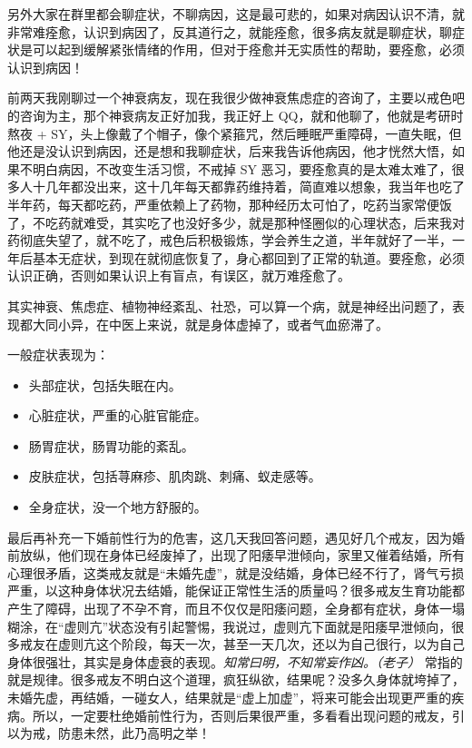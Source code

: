 另外大家在群里都会聊症状，不聊病因，这是最可悲的，如果对病因认识不清，就非常难痊愈，认识到病因了，反其道行之，就能痊愈，很多病友就是聊症状，聊症状是可以起到缓解紧张情绪的作用，但对于痊愈并无实质性的帮助，要痊愈，必须认识到病因！

前两天我刚聊过一个神衰病友，现在我很少做神衰焦虑症的咨询了，主要以戒色吧的咨询为主，那个神衰病友正好加我，我正好上 QQ，就和他聊了，他就是考研时熬夜 + SY，头上像戴了个帽子，像个紧箍咒，然后睡眠严重障碍，一直失眠，但他还是没认识到病因，还是想和我聊症状，后来我告诉他病因，他才恍然大悟，如果不明白病因，不改变生活习惯，不戒掉 SY 恶习，要痊愈真的是太难太难了，很多人十几年都没出来，这十几年每天都靠药维持着，简直难以想象，我当年也吃了半年药，每天都吃药，严重依赖上了药物，那种经历太可怕了，吃药当家常便饭了，不吃药就难受，其实吃了也没好多少，就是那种怪圈似的心理状态，后来我对药彻底失望了，就不吃了，戒色后积极锻炼，学会养生之道，半年就好了一半，一年后基本无症状，到现在就彻底恢复了，身心都回到了正常的轨道。要痊愈，必须认识正确，否则如果认识上有盲点，有误区，就万难痊愈了。

其实神衰、焦虑症、植物神经紊乱、社恐，可以算一个病，就是神经出问题了，表现都大同小异，在中医上来说，就是身体虚掉了，或者气血瘀滞了。

一般症状表现为：

\begin{itemize}
    \item 头部症状，包括失眠在内。
    \item 心脏症状，严重的心脏官能症。
    \item 肠胃症状，肠胃功能的紊乱。
    \item 皮肤症状，包括荨麻疹、肌肉跳、刺痛、蚁走感等。
    \item 全身症状，没一个地方舒服的。
\end{itemize}

最后再补充一下婚前性行为的危害，这几天我回答问题，遇见好几个戒友，因为婚前放纵，他们现在身体已经废掉了，出现了阳痿早泄倾向，家里又催着结婚，所有心理很矛盾，这类戒友就是“未婚先虚”，就是没结婚，身体已经不行了，肾气亏损严重，以这种身体状况去结婚，能保证正常性生活的质量吗？很多戒友生育功能都产生了障碍，出现了不孕不育，而且不仅仅是阳痿问题，全身都有症状，身体一塌糊涂，在“虚则亢”状态没有引起警惕，我说过，虚则亢下面就是阳痿早泄倾向，很多戒友在虚则亢这个阶段，每天一次，甚至一天几次，还以为自己很行，以为自己身体很强壮，其实是身体虚衰的表现。\textit{知常曰明，不知常妄作凶。（老子）} 常指的就是规律。很多戒友不明白这个道理，疯狂纵欲，结果呢？没多久身体就垮掉了，未婚先虚，再结婚，一碰女人，结果就是“虚上加虚”，将来可能会出现更严重的疾病。所以，一定要杜绝婚前性行为，否则后果很严重，多看看出现问题的戒友，引以为戒，防患未然，此乃高明之举！
